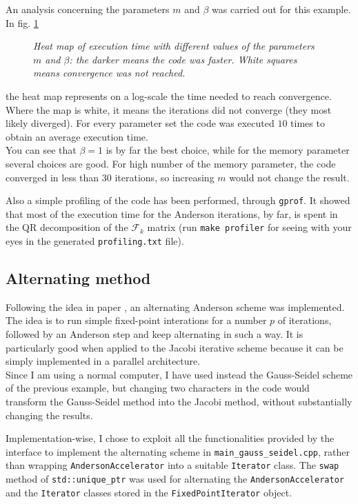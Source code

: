 \documentclass[12pt]{article}
\begin{document}
			An analysis concerning the parameters $m$ and $\beta$ was carried out for this example. In fig. \ref{fig:Heat}
			\begin{figure}
			{\scriptsize
			}
			\centering
			\caption{\textit{Heat map of execution time with different values of the parameters $m$ and $\beta$: the darker means the code was faster. White squares means
			convergence was not reached.}}
			\label{fig:Heat}
			\end{figure}
			the heat map represents on a log-scale the time needed to reach convergence.
			Where the map is white, it means the iterations did not converge (they most likely
			diverged). For every parameter set the code was executed $10$ times to obtain an average execution time.\\
			You can see that $\beta=1$ is by far the best choice, while for the memory parameter
			several choices are good. For high number of the memory parameter, the code converged in less than
			$30$	iterations, so increasing $m$ would not change the result.
			
			Also a simple profiling of the code has been performed, through \verb|gprof|. It showed
			that most of the execution time for the Anderson iterations, by far, is spent
			in the QR decomposition of the $\mathscr{F}_k$ matrix (run
			\verb|make profiler| for seeing with your eyes in the generated \verb|profiling.txt| file).
			
		\subsection{Alternating method}
			Following the idea in paper \cite{Pratapa}, an alternating Anderson scheme was implemented.\\
			The idea is to run simple fixed-point interations for a number $p$ of iterations, followed by
			an Anderson step and keep alternating in such a way. It is particularly good when applied
			to the Jacobi iterative scheme because it can be simply implemented
			in a parallel architecture.\\
			Since I am using a normal computer, I have used instead the Gauss-Seidel scheme of the previous example,
			but changing two characters in the code would transform the Gauss-Seidel method into the Jacobi method,
			without substantially changing the results.
			
			Implementation-wise, I chose to exploit all the functionalities provided by the interface
			to implement the alternating scheme in	\verb|main_gauss_seidel.cpp|, rather than
			wrapping \verb|AndersonAccelerator| into a suitable \verb|Iterator| class. 
			The \verb|swap| method of \verb|std::unique_ptr| was used for alternating the \verb|AndersonAccelerator|
			and the \verb|Iterator| classes stored in the \verb|FixedPointIterator| object.
			
\end{document}

